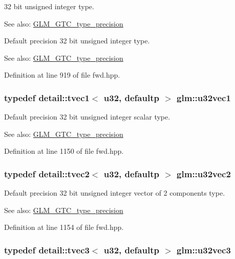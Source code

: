 32 bit unsigned integer type. \begin{Desc}
\item[See also:]\hyperlink{group__gtc__type__precision}{GLM\_\-GTC\_\-type\_\-precision}\end{Desc}
Default precision 32 bit unsigned integer type. \begin{Desc}
\item[See also:]\hyperlink{group__gtc__type__precision}{GLM\_\-GTC\_\-type\_\-precision} \end{Desc}


Definition at line 919 of file fwd.hpp.\hypertarget{group__gtc__type__precision_gc8263c8c0bb36bc5c3d109f508e0fb41}{
\subsubsection[u32vec1]{\setlength{\rightskip}{0pt plus 5cm}typedef detail::tvec1$<$ u32, defaultp $>$ {\bf glm::u32vec1}}}
\label{group__gtc__type__precision_gc8263c8c0bb36bc5c3d109f508e0fb41}


Default precision 32 bit unsigned integer scalar type. \begin{Desc}
\item[See also:]\hyperlink{group__gtc__type__precision}{GLM\_\-GTC\_\-type\_\-precision} \end{Desc}


Definition at line 1150 of file fwd.hpp.\hypertarget{group__gtc__type__precision_ga543e17450ca67dee12e2c41badfb3a7}{
\subsubsection[u32vec2]{\setlength{\rightskip}{0pt plus 5cm}typedef detail::tvec2$<$ u32, defaultp $>$ {\bf glm::u32vec2}}}
\label{group__gtc__type__precision_ga543e17450ca67dee12e2c41badfb3a7}


Default precision 32 bit unsigned integer vector of 2 components type. \begin{Desc}
\item[See also:]\hyperlink{group__gtc__type__precision}{GLM\_\-GTC\_\-type\_\-precision} \end{Desc}


Definition at line 1154 of file fwd.hpp.\hypertarget{group__gtc__type__precision_g7c88634a005904a441cba739d7cc4055}{
\subsubsection[u32vec3]{\setlength{\rightskip}{0pt plus 5cm}typedef detail::tvec3$<$ u32, defaultp $>$ {\bf glm::u32vec3}}}
\label{group__gtc__type__precision_g7c88634a005904a441cba739d7cc4055}


